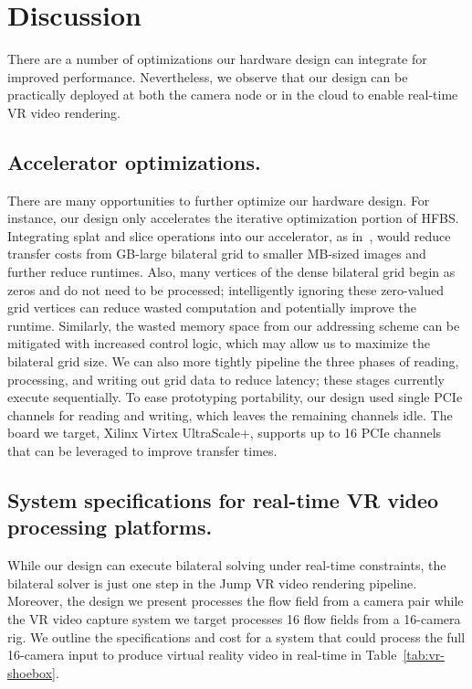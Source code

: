 \section{Discussion}
There are a number of optimizations our hardware design can integrate for improved performance.
Nevertheless, we observe that our design can be practically deployed at both the camera node or in the cloud to enable real-time VR video rendering.


\subsection{Accelerator optimizations.}
There are many opportunities to further optimize our hardware design.
For instance, our design only accelerates the iterative optimization portion of HFBS.
Integrating splat and slice operations into our accelerator, as in~\cite{bilat_isscc}, would reduce transfer costs from GB-large bilateral grid to smaller MB-sized images and further reduce runtimes.
Also, many vertices of the dense bilateral grid begin as zeros and do not need to be processed;  intelligently ignoring these zero-valued grid vertices can reduce wasted computation and potentially improve the runtime.
Similarly, the wasted memory space from our addressing scheme can be mitigated with increased control logic, which may allow us to maximize the bilateral grid size.
We can also more tightly pipeline the three phases of reading, processing, and writing out grid data to reduce latency; these stages currently execute sequentially.
To ease prototyping portability, our design used single PCIe channels for reading and writing, which leaves the remaining channels idle.
The board we target, Xilinx Virtex UltraScale+, supports up to 16 PCIe channels that can be leveraged to improve transfer times.

\subsection{System specifications for real-time VR video processing platforms.}
While our design can execute bilateral solving under real-time constraints, the bilateral solver is just one step in the Jump VR video rendering pipeline.
Moreover, the design we present processes the flow field from a camera pair while the VR video capture system we target processes 16 flow fields from a 16-camera rig.
We outline the specifications and cost for a system that could process the full 16-camera input to produce virtual reality video in real-time in Table~\ref{tab:vr-shoebox}.

